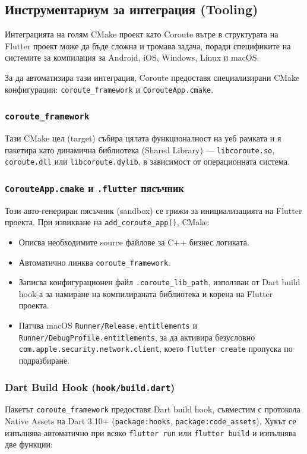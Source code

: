 \subsection{Инструментариум за интеграция (Tooling)}
Интеграцията на голям CMake проект като Coroute вътре в структурата на Flutter проект може да бъде сложна и тромава задача, поради спецификите на системите за компилация за Android, iOS, Windows, Linux и macOS.

За да автоматизира тази интеграция, Coroute предоставя специализирани CMake конфигурации: \texttt{coroute\_framework} и \texttt{CorouteApp.cmake}.

\subsubsection{\texttt{coroute\_framework}}
Тази CMake цел (target) събира цялата функционалност на уеб рамката и я пакетира като динамична библиотека (Shared Library) --- \texttt{libcoroute.so}, \texttt{coroute.dll} или \texttt{libcoroute.dylib}, в зависимост от операционната система. 

\subsubsection{\texttt{CorouteApp.cmake} и \texttt{.flutter} пясъчник}
Този авто-генериран пясъчник (sandbox) се грижи за инициализацията на Flutter проекта. При извикване на \texttt{add\_coroute\_app()}, CMake:
\begin{itemize}
    \item Описва необходимите source файлове за C++ бизнес логиката.
    \item Автоматично линква \texttt{coroute\_framework}.
    \item Записва конфигурационен файл \texttt{.coroute\_lib\_path}, използван от Dart build hook-а за намиране на компилираната библиотека и корена на Flutter проекта.
    \item Патчва macOS \texttt{Runner/Release.entitlements} и \texttt{Runner/DebugProfile.entitlements}, за да активира безусловно \texttt{com.apple.security.network.client}, което \texttt{flutter create} пропуска по подразбиране.
\end{itemize}

\subsubsection{Dart Build Hook (\texttt{hook/build.dart})}
Пакетът \texttt{coroute\_framework} предоставя Dart build hook, съвместим с протокола Native Assets на Dart 3.10+ (\texttt{package:hooks}, \texttt{package:code\_assets}). Хукът се изпълнява автоматично при всяко \texttt{flutter run} или \texttt{flutter build} и изпълнява две функции:

